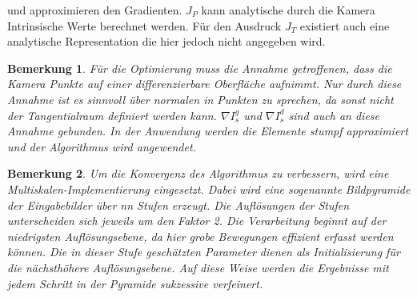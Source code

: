 \documentclass[12pt,DIV=15,BCOR=15mm,twoside,headsepline,abstract=true,listof=totoc,bibliography=totoc]{scrreprt}
\newtheorem{remark}{Bemerkung}[chapter]
\theoremstyle{remark}    %
\begin{document}
    und approximieren den Gradienten. $J_P$ kann analytische durch die Kamera Intrinsische Werte berechnet werden. Für den Ausdruck $J_T$ existiert auch eine analytische 
    Representation die hier jedoch nicht angegeben wird.
    \begin{remark}\label{bem:diff}
    Für die Optimierung muss die Annahme getroffenen, dass die Kamera Punkte auf einer differenzierbare Oberfläche 
    aufnimmt. Nur durch diese Annahme ist es sinnvoll über normalen in Punkten zu sprechen, da sonst nicht der Tangentialraum definiert werden kann. $\nabla I_s^g$ 
    und $\nabla I_s^d$ sind auch an diese Annahme gebunden. In der Anwendung werden die Elemente stumpf approximiert und der Algorithmus wird angewendet.
    \end{remark}
    \begin{remark}\label{bem:multiscale}
    Um die Konvergenz des Algorithmus zu verbessern, wird eine Multiskalen-Implementierung eingesetzt.
    Dabei wird eine sogenannte Bildpyramide der Eingabebilder über nn Stufen erzeugt.
    Die Auflösungen der Stufen unterscheiden sich jeweils um den Faktor 2.
    Die Verarbeitung beginnt auf der niedrigsten Auflösungsebene, da hier grobe Bewegungen effizient erfasst werden können.
    Die in dieser Stufe geschätzten Parameter dienen als Initialisierung für die nächsthöhere Auflösungsebene.
    Auf diese Weise werden die Ergebnisse mit jedem Schritt in der Pyramide sukzessive verfeinert. \cite{djema2023densevisualodometryusing}
    \end{remark}
    
\end{document}
